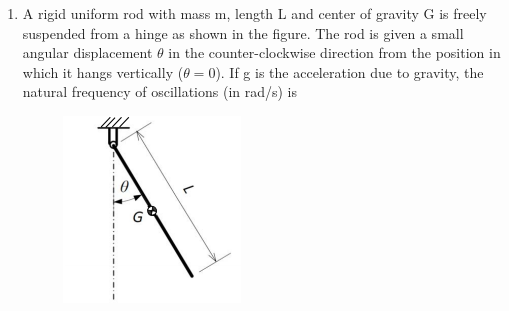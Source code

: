 \documentclass[a4paper,10pt]{article}
\begin{document}
\begin{enumerate}
    \item A rigid uniform rod with mass m, length L and center of gravity G is freely suspended from a hinge as shown in the figure. The rod is given a small angular displacement $\theta$ in the counter-clockwise direction from the position in which it hangs vertically ($\theta = 0$). If g is the acceleration due to gravity, the natural frequency of oscillations (in rad/s) is
    \begin{figure}[H] \centering \includegraphics[width=0.4\columnwidth]{q13_solid.png} \caption*{} \label{fig:q13_solid} \end{figure}
    \hfill{}
    \begin{enumerate}[label=\Alph*)]
    \end{enumerate}


\end{enumerate}
\end{document}
